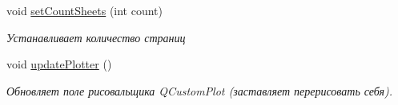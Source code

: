 \begin{DoxyCompactItemize}
\hypertarget{class_graph_window_af7499e98193373a6322470c5dfe961a8}{}\label{class_graph_window_af7499e98193373a6322470c5dfe961a8} 
void \hyperlink{class_graph_window_af7499e98193373a6322470c5dfe961a8}{set\+Count\+Sheets} (int count)
\begin{DoxyCompactList}\small\item\em Устанавливает количество страниц \end{DoxyCompactList}\item 
\hypertarget{class_graph_window_acdc8aa7200c0bfddee48a16a0875986a}{}\label{class_graph_window_acdc8aa7200c0bfddee48a16a0875986a} 
void \hyperlink{class_graph_window_acdc8aa7200c0bfddee48a16a0875986a}{update\+Plotter} ()
\begin{DoxyCompactList}\small\item\em Обновляет поле рисовальщика Q\+Custom\+Plot (заставляет перерисовать себя). \end{DoxyCompactList}\end{DoxyCompactItemize}
